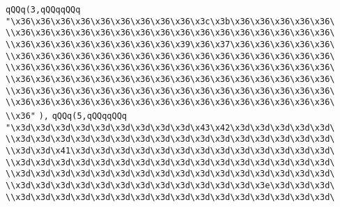 \verb|qQQq(3,qQQqqQQq|\newline
\verb|"\x36\x36\x36\x36\x36\x36\x36\x36\x36\x3c\x3b\x36\x36\x36\x36\x36\|\newline
\verb|\\x36\x36\x36\x36\x36\x36\x36\x36\x36\x36\x36\x36\x36\x36\x36\x36\|\newline
\verb|\\x36\x36\x36\x36\x36\x36\x36\x36\x39\x36\x37\x36\x36\x36\x36\x36\|\newline
\verb|\\x36\x36\x36\x36\x36\x36\x36\x36\x36\x36\x36\x36\x36\x36\x36\x36\|\newline
\verb|\\x36\x36\x36\x36\x36\x36\x36\x36\x36\x36\x36\x36\x36\x36\x36\x36\|\newline
\verb|\\x36\x36\x36\x36\x36\x36\x36\x36\x36\x36\x36\x36\x36\x36\x36\x36\|\newline
\verb|\\x36\x36\x36\x36\x36\x36\x36\x36\x36\x36\x36\x36\x36\x36\x36\x36\|\newline
\verb|\\x36\x36\x36\x36\x36\x36\x36\x36\x36\x36\x36\x36\x36\x36\x36\x36\|\newline
\verb|\\x36"|\newline
\verb|),|\newline
\verb|qQQq(5,qQQqqQQq|\newline
\verb|"\x3d\x3d\x3d\x3d\x3d\x3d\x3d\x3d\x3d\x43\x42\x3d\x3d\x3d\x3d\x3d\|\newline
\verb|\\x3d\x3d\x3d\x3d\x3d\x3d\x3d\x3d\x3d\x3d\x3d\x3d\x3d\x3d\x3d\x3d\|\newline
\verb|\\x3d\x3d\x41\x3d\x3d\x3d\x3d\x3d\x3d\x3d\x3d\x3d\x3d\x3d\x3d\x3d\|\newline
\verb|\\x3d\x3d\x3d\x3d\x3d\x3d\x3d\x3d\x3d\x3d\x3d\x3d\x3d\x3d\x3d\x3d\|\newline
\verb|\\x3d\x3d\x3d\x3d\x3d\x3d\x3d\x3d\x3d\x3d\x3d\x3d\x3d\x3d\x3d\x3d\|\newline
\verb|\\x3d\x3d\x3d\x3d\x3d\x3d\x3d\x3d\x3d\x3d\x3d\x3d\x3e\x3d\x3d\x3d\|\newline
\verb|\\x3d\x3d\x3d\x3d\x3d\x3d\x3d\x3d\x3d\x3d\x3d\x3d\x3d\x3d\x3d\x3d\|\newline
